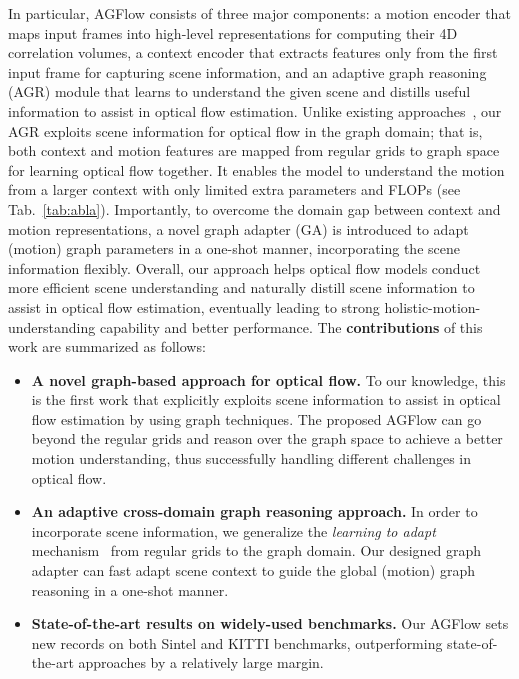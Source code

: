 \documentclass[letterpaper]{article} %
\begin{document}
In particular, AGFlow consists of three major components: a motion encoder that maps input frames into high-level representations for computing their 4D correlation volumes, a context encoder that extracts features only from the first input frame for capturing scene information, and an adaptive graph reasoning (AGR) module that learns to understand the given scene and distills useful information to assist in optical flow estimation. Unlike existing approaches~\cite{Teed2020RAFTRA,Jiang2021LearningOF}, our AGR exploits scene information for optical flow in the graph domain; that is, both context and motion features are mapped from regular grids to graph space for learning optical flow together. It enables the model to understand the motion from a larger context with only limited extra parameters and FLOPs (see Tab.~\ref{tab:abla}). Importantly, to overcome the domain gap between context and motion representations, a novel graph adapter (GA) is introduced to adapt (motion) graph parameters in a one-shot manner, incorporating the scene information flexibly.  Overall, our approach helps optical flow models conduct more efficient scene understanding and naturally distill scene information to assist in optical flow estimation, eventually leading to strong holistic-motion-understanding capability and better performance.  The {\bfseries contributions} of this work are summarized as follows:
\begin{itemize}
	\item[$\bullet$] 
	{\bfseries A novel graph-based approach for optical flow.} To our knowledge, this is the first work that explicitly exploits scene information to assist in optical flow estimation by using graph techniques. The proposed AGFlow can go beyond the regular grids and reason over the graph space to achieve a better motion understanding, thus successfully handling different challenges in optical flow. 
	
	\item[$\bullet$] 
	{\bfseries An adaptive cross-domain graph reasoning approach.} In order to incorporate scene information, we generalize the \emph{learning to adapt} mechanism~\cite{Bertinetto2016LearningFO} from regular grids to the graph domain. Our designed graph adapter can fast adapt scene context to guide the global (motion) graph reasoning in a one-shot manner.
	
	\item[$\bullet$] 
	{\bfseries State-of-the-art results on widely-used benchmarks.} Our AGFlow sets new records on both Sintel and KITTI benchmarks, outperforming state-of-the-art approaches by a relatively large margin.
\end{itemize}
\end{document}
